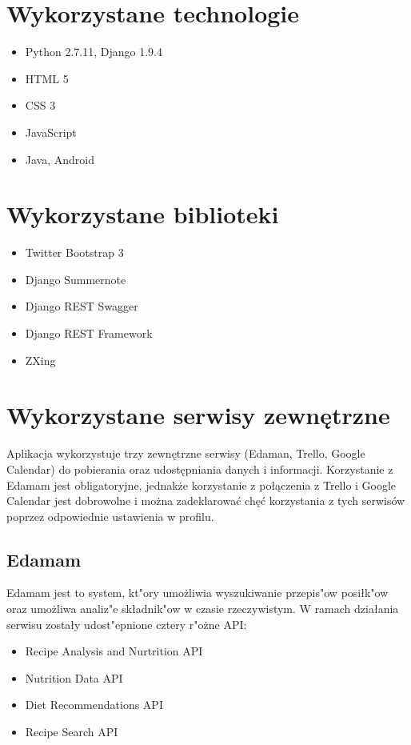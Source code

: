\documentclass{article}
\begin{document}
\section{Wykorzystane technologie}

\begin{itemize}
\item Python 2.7.11, Django 1.9.4
\item HTML 5
\item CSS 3
\item JavaScript
\item Java, Android
\end{itemize}

\section{Wykorzystane biblioteki}

\begin{itemize}
\item Twitter Bootstrap 3
\item Django Summernote
\item Django REST Swagger
\item Django REST Framework
\item ZXing 
\end{itemize}


\section{Wykorzystane serwisy zewnętrzne}
Aplikacja wykorzystuje trzy zewnętrzne serwisy (Edaman, Trello, Google Calendar) do pobierania oraz udostępniania danych i informacji. Korzystanie z Edamam jest obligatoryjne, jednakże korzystanie z połączenia z Trello i Google Calendar jest dobrowolne i można zadeklarować chęć korzystania z tych serwisów poprzez odpowiednie ustawienia w profilu.

\subsection{Edamam}
Edamam jest to system, kt"ory umo\.zliwia wyszukiwanie przepis"ow posiłk"ow oraz umo\.zliwa analiz"e składnik"ow w czasie rzeczywistym. W ramach działania serwisu zostały udost"epnione cztery r"o\.zne API:
\begin{itemize}
	\item Recipe Analysis and Nurtrition API
	\item Nutrition Data API
	\item Diet Recommendations API
	\item Recipe Search API
\end{itemize}
\end{document}
